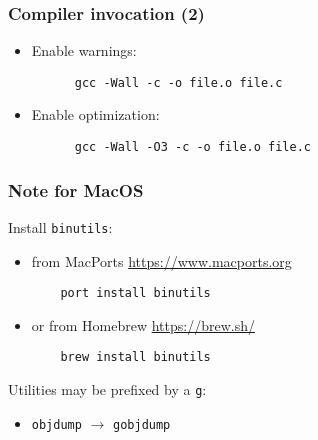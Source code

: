 \documentclass[12pt]{article}
\begin{document}
\subsubsection{Compiler invocation (2)}

\begin{itemize}
  \item Enable warnings:
    \begin{verbatim}
      gcc -Wall -c -o file.o file.c
    \end{verbatim}
  \item Enable optimization:
    \begin{verbatim}
      gcc -Wall -O3 -c -o file.o file.c
    \end{verbatim}
\end{itemize}

\subsubsection{Note for MacOS}
Install \texttt{binutils}:
\begin{itemize}
    \item from MacPorts \url{https://www.macports.org}
    \begin{verbatim}
    port install binutils
    \end{verbatim}
    \item or from Homebrew \url{https://brew.sh/}
    \begin{verbatim}
    brew install binutils
    \end{verbatim}
\end{itemize}
Utilities may be prefixed by a \texttt{g}:
\begin{itemize}
    \item \texttt{objdump} $\rightarrow$ \texttt{gobjdump}
\end{itemize}
\end{document}
